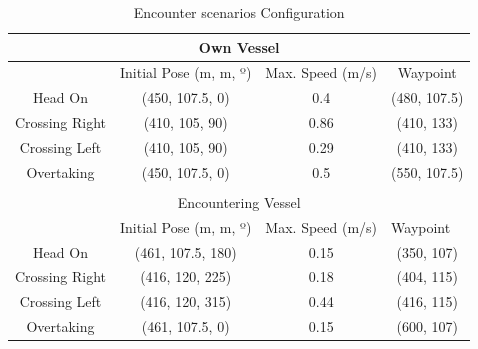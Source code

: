     \begin{table}[H]
    \centering
    \begin{tabular}{@{}cccc@{}}
        \toprule
        \multicolumn{4}{c}{Own Vessel}                                                                                                                                 \\ \midrule
        \multicolumn{1}{|c|}{}               & \multicolumn{1}{c|}{Initial Pose (m, m, º)} & \multicolumn{1}{c|}{Max. Speed (m/s)} & \multicolumn{1}{c|}{Waypoint}     \\ \midrule
        \multicolumn{1}{|c|}{Head On}        & \multicolumn{1}{c|}{(450, 107.5, 0)}        & \multicolumn{1}{c|}{0.4}              & \multicolumn{1}{c|}{(480, 107.5)} \\ \midrule
        \multicolumn{1}{|c|}{Crossing Right} & \multicolumn{1}{c|}{(410, 105, 90)}         & \multicolumn{1}{c|}{0.86}             & \multicolumn{1}{c|}{(410, 133)}   \\ \midrule
        \multicolumn{1}{|c|}{Crossing Left}  & \multicolumn{1}{c|}{(410, 105, 90)}         & \multicolumn{1}{c|}{0.29}             & \multicolumn{1}{c|}{(410, 133)}   \\ \midrule
        \multicolumn{1}{|c|}{Overtaking}     & \multicolumn{1}{c|}{(450, 107.5, 0)}        & \multicolumn{1}{c|}{0.5}              & \multicolumn{1}{c|}{(550, 107.5)} \\ \midrule
        \multicolumn{1}{l}{}                 & \multicolumn{1}{l}{}                        & \multicolumn{1}{l}{}                  & \multicolumn{1}{l}{}              \\ \midrule
        \multicolumn{4}{c}{Encountering Vessel}                                                                                                                        \\ \midrule
        \multicolumn{1}{|l|}{}               & \multicolumn{1}{l|}{Initial Pose (m, m, º)} & \multicolumn{1}{l|}{Max. Speed (m/s)} & \multicolumn{1}{l|}{Waypoint}     \\ \midrule
        \multicolumn{1}{|c|}{Head On}        & \multicolumn{1}{c|}{(461, 107.5, 180)}      & \multicolumn{1}{c|}{0.15}             & \multicolumn{1}{c|}{(350, 107)}   \\ \midrule
        \multicolumn{1}{|c|}{Crossing Right} & \multicolumn{1}{c|}{(416, 120, 225)}        & \multicolumn{1}{c|}{0.18}             & \multicolumn{1}{c|}{(404, 115)}   \\ \midrule
        \multicolumn{1}{|c|}{Crossing Left}  & \multicolumn{1}{c|}{(416, 120, 315)}        & \multicolumn{1}{c|}{0.44}             & \multicolumn{1}{c|}{(416, 115)}   \\ \midrule
        \multicolumn{1}{|c|}{Overtaking}     & \multicolumn{1}{c|}{(461, 107.5, 0)}        & \multicolumn{1}{c|}{0.15}             & \multicolumn{1}{c|}{(600, 107)}   \\ \bottomrule
        \end{tabular}
    \caption{Encounter scenarios Configuration}
    \label{tab:simulation_scenarios_configuration}
    \end{table}
    
